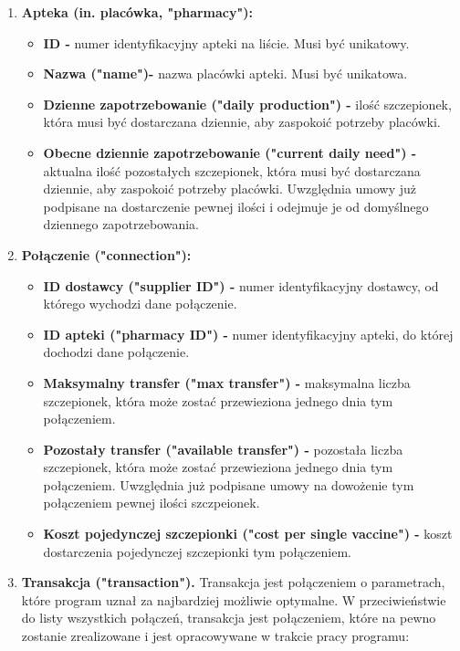 \documentclass[a4paper]{article}
\begin{document}
\begin{enumerate}
    \item \textbf{Apteka (in. placówka, "pharmacy"):}
          \begin{itemize}
              \item \textbf{ID -} numer identyfikacyjny apteki na liście. Musi być unikatowy.
              \item \textbf{Nazwa ("name")-} nazwa placówki apteki. Musi być unikatowa.
			\item \textbf{Dzienne zapotrzebowanie ("daily production") -} ilość szczepionek, która musi być dostarczana dziennie, aby zaspokoić potrzeby placówki.
			\item \textbf{Obecne dziennie zapotrzebowanie ("current daily need") -} aktualna ilość pozostałych szczepionek, która musi być dostarczana dziennie, aby zaspokoić potrzeby placówki. Uwzględnia umowy już podpisane na dostarczenie pewnej ilości i odejmuje je od domyślnego dziennego zapotrzebowania.
          \end{itemize}
	\item \textbf{Połączenie ("connection"):}
          \begin{itemize}
              \item \textbf{ID dostawcy ("supplier ID") -} numer identyfikacyjny dostawcy, od którego wychodzi dane połączenie.
			\item \textbf{ID apteki ("pharmacy ID") -} numer identyfikacyjny apteki, do której dochodzi dane połączenie.
              \item \textbf{Maksymalny transfer ("max transfer") -} maksymalna liczba szczepionek, która może zostać przewieziona jednego dnia tym połączeniem.
			\item \textbf{Pozostały transfer ("available transfer") -} pozostała liczba szczepionek, która może zostać przewieziona jednego dnia tym połączeniem. Uwzględnia już podpisane umowy na dowożenie tym połączeniem pewnej ilości szczpeionek.
			\item \textbf{Koszt pojedynczej szczepionki ("cost per single vaccine") -} koszt dostarczenia pojedynczej szczepionki tym połączeniem.
		\end{itemize}
	\item \textbf{Transakcja ("transaction").} Transakcja jest połączeniem o parametrach, które program uznał za najbardziej możliwie optymalne. W przeciwieństwie do listy wszystkich połączeń, transakcja jest połączeniem, które na pewno zostanie zrealizowane i jest opracowywane w trakcie pracy programu:
          \begin{itemize}

\end{itemize}
\end{enumerate}
\end{document}
